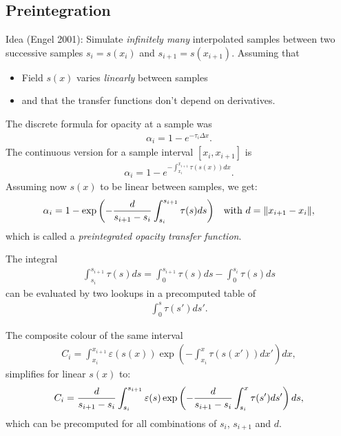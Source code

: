 \subsection{Preintegration}
Idea (Engel 2001): Simulate \emph{infinitely many} interpolated samples between two successive samples $s_i= s(x_i)$ and $s_{i+1} = s(x_{i+1})$. Assuming that 
\begin{itemize}
    \item Field $s(x)$ varies \emph{linearly} between samples
    \item and that the transfer functions don't depend on derivatives.
\end{itemize}

The discrete formula for opacity at a sample was
\begin{align*}
    \alpha_i = 1-e^{-\tau_i \Delta x}.
\end{align*}
The continuous version for a sample interval $[x_i, x_{i+1}]$ is 
\begin{align*}
    \alpha_i = 1-e^{-\int_{x_i}^{x_{i+1}} \tau(s(x)) dx}.
\end{align*}
Assuming now $s(x)$ to be linear between samples, we get:
\begin{align*}
    \alpha_i &= 1-\exp\left( {-{d\over s_{i+1}-s_i} \int_{s_i}^{s_{i+1}}\tau(s) ds}\right) &\text{with } d= \norm{x_{i+1}-x_i}, 
\end{align*}
which is called a \emph{preintegrated opacity transfer function}.


The integral
\begin{align*}
\int_{s_i}^{s_{i+1}} \tau(s) ds = \int_0^{s_{i+1}} \tau(s) ds - \int_0^{s_i} \tau(s)ds
\end{align*}
can be evaluated by two lookups in a precomputed table of 
\begin{align*}
\int_0^{s} \tau(s')ds'.
\end{align*}

The composite colour of the same interval
\begin{align*}
  C_i = \int_{x_i}^{x_{i+1}} \varepsilon (s(x))\exp\left(-\int_{x_i}^x \tau(s(x'))dx'\right) dx,
\end{align*}
simplifies for linear $s(x)$ to:
\begin{align*}
  C_i = {d\over {s_{i+1}-s_i}} \int_{s_i}^{s_{i+1}} \varepsilon (s)\exp\left(-{d\over {s_{i+1}-s_i}} \int_{s_i}^x \tau(s')ds'\right) ds,
\end{align*}
which can be precomputed for all combinations of $s_i$, $s_{i+1}$ and $d$.

